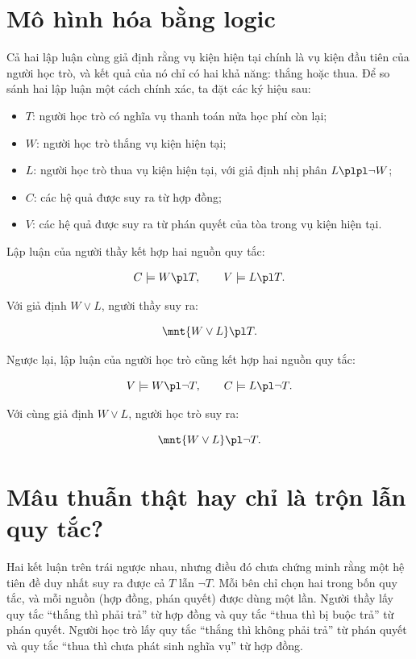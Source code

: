 \section*{Mô hình hóa bằng logic}

Cả hai lập luận cùng giả định rằng vụ kiện hiện tại chính là vụ kiện đầu tiên của người học trò, và kết quả của nó chỉ có hai khả năng: thắng hoặc thua. Để so sánh hai lập luận một cách chính xác, ta đặt các ký hiệu sau:

\begin{itemize}
    \item $T$: người học trò có nghĩa vụ thanh toán nửa học phí còn lại;
    \item $W$: người học trò thắng vụ kiện hiện tại;
    \item $L$: người học trò thua vụ kiện hiện tại, với giả định nhị phân $L \plpl \neg W$;
    \item $C$: các hệ quả được suy ra từ hợp đồng;
    \item $V$: các hệ quả được suy ra từ phán quyết của tòa trong vụ kiện hiện tại.
\end{itemize}

Lập luận của người thầy kết hợp hai nguồn quy tắc:

\[
C \models W \pl T,
\qquad
V \models L \pl T.
\]

Với giả định $W \vee L$, người thầy suy ra:

\[
\mnt{W \vee L} \pl T.
\]

Ngược lại, lập luận của người học trò cũng kết hợp hai nguồn quy tắc:

\[
V \models W \pl \neg T,
\qquad
C \models L \pl \neg T.
\]

Với cùng giả định $W \vee L$, người học trò suy ra:

\[
\mnt{W \vee L} \pl \neg T.
\]

\section*{Mâu thuẫn thật hay chỉ là trộn lẫn quy tắc?}

Hai kết luận trên trái ngược nhau, nhưng điều đó chưa chứng minh rằng một hệ tiên đề duy nhất suy ra được cả $T$ lẫn $\neg T$. Mỗi bên chỉ chọn hai trong bốn quy tắc, và mỗi nguồn (hợp đồng, phán quyết) được dùng một lần. Người thầy lấy quy tắc “thắng thì phải trả” từ hợp đồng và quy tắc “thua thì bị buộc trả” từ phán quyết. Người học trò lấy quy tắc “thắng thì không phải trả” từ phán quyết và quy tắc “thua thì chưa phát sinh nghĩa vụ” từ hợp đồng.

